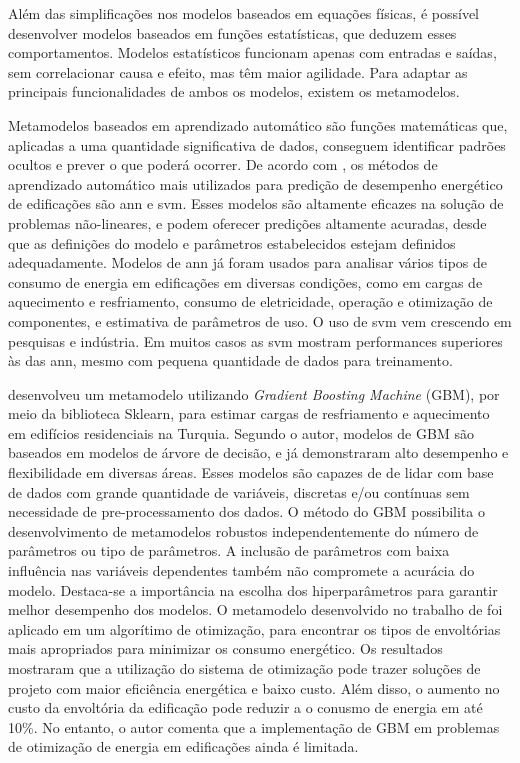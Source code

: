 \documentclass{article}
\begin{document}
Além das simplificações nos modelos baseados em equações físicas, é possível desenvolver modelos baseados em funções estatísticas, que deduzem esses comportamentos. Modelos estatísticos funcionam apenas com entradas e saídas, sem correlacionar causa e efeito, mas têm maior agilidade. Para adaptar as principais funcionalidades de ambos os modelos, existem os metamodelos.

Metamodelos baseados em aprendizado automático são funções matemáticas que, aplicadas a uma quantidade significativa de dados, conseguem identificar padrões ocultos e prever o que poderá ocorrer. De acordo com  \citet{Zhao2012}, os métodos de aprendizado automático mais utilizados para predição de desempenho energético de edificações são \acrfull{ann} e \acrfull{svm}. Esses modelos são altamente eficazes na solução de problemas não-lineares, e podem oferecer predições altamente acuradas, desde que as definições do modelo e parâmetros estabelecidos estejam definidos adequadamente. Modelos de \acrshort{ann} já foram usados para analisar vários tipos de consumo de energia em edificações em diversas condições, como em cargas de aquecimento e resfriamento, consumo de eletricidade, operação e otimização de componentes, e estimativa de parâmetros de uso. O uso de \acrshort{svm} vem crescendo em pesquisas e indústria. Em muitos casos as \acrshort{svm} mostram performances superiores às das \acrshort{ann}, mesmo com pequena quantidade de dados para treinamento.

\citet{YIGIT2021} desenvolveu um metamodelo utilizando \textit{Gradient Boosting Machine} (GBM), por meio da biblioteca Sklearn, para estimar cargas de resfriamento e aquecimento em edifícios residenciais na Turquia. 
Segundo o autor, modelos de GBM são baseados em modelos de árvore de decisão, e já demonstraram alto desempenho e flexibilidade em diversas áreas. 
Esses modelos são capazes de de lidar com base de dados com grande quantidade de variáveis, discretas e/ou contínuas sem necessidade de pre-processamento dos dados. 
O método do GBM possibilita o desenvolvimento de metamodelos robustos independentemente do número de parâmetros ou tipo de parâmetros. 
A inclusão de parâmetros com baixa influência nas variáveis dependentes também não compromete a acurácia do modelo. 
Destaca-se a importância na escolha dos hiperparâmetros para garantir melhor desempenho dos modelos.
O metamodelo desenvolvido no trabalho de \citet{YIGIT2021} foi aplicado em um algorítimo de otimização, para encontrar os tipos de envoltórias mais apropriados para minimizar os consumo energético. Os resultados mostraram que a utilização do sistema de otimização pode trazer soluções de projeto com maior eficiência energética e baixo custo. Além disso, o aumento no custo da envoltória da edificação pode reduzir a o conusmo de energia em até 10\%.
No entanto, o autor comenta que a implementação de GBM em problemas de otimização de energia em edificações ainda é limitada.
\end{document}
